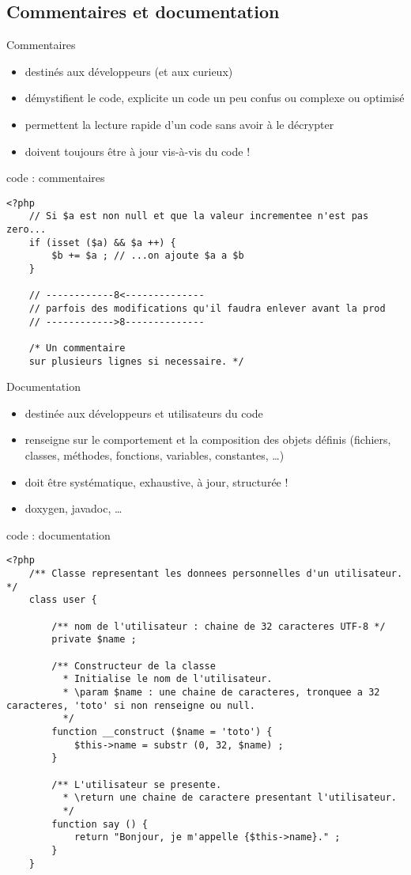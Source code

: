 \subsection{Commentaires et documentation}

\begin{frame}[containsverbatim]{Commentaires}
	\begin{itemize}
		\item destinés aux développeurs (et aux curieux)
		\item démystifient le code, explicite un code un peu confus ou complexe ou optimisé
		\item permettent la lecture rapide d'un code sans avoir à le décrypter
		\item doivent toujours être à jour vis-à-vis du code ! 
	\end{itemize}
	\begin{block}{code : commentaires}
		\begin{lstlisting}
<?php
	// Si $a est non null et que la valeur incrementee n'est pas zero...
	if (isset ($a) && $a ++) {
		$b += $a ; // ...on ajoute $a a $b
	}
	
	// ------------8<--------------
	// parfois des modifications qu'il faudra enlever avant la prod
	// ------------>8--------------	
	
	/* Un commentaire
	sur plusieurs lignes si necessaire. */
		\end{lstlisting}
	\end{block}
\end{frame}

\begin{frame}[containsverbatim]{Documentation}
	\begin{itemize}
		\item destinée aux développeurs et utilisateurs du code
		\item renseigne sur le comportement et la composition des objets définis (fichiers, classes, méthodes, fonctions, variables, constantes, \ldots)
		\item doit être systématique, exhaustive, à jour, structurée !
		\item doxygen, javadoc, \ldots
	\end{itemize}
	\begin{block}{code : documentation}
		\begin{lstlisting}
<?php
	/** Classe representant les donnees personnelles d'un utilisateur. */
	class user {
	
		/** nom de l'utilisateur : chaine de 32 caracteres UTF-8 */
		private $name ;
		
		/** Constructeur de la classe
		  * Initialise le nom de l'utilisateur.
		  * \param $name : une chaine de caracteres, tronquee a 32 caracteres, 'toto' si non renseigne ou null.
		  */
		function __construct ($name = 'toto') {
			$this->name = substr (0, 32, $name) ;
		}
		
		/** L'utilisateur se presente.
		  * \return une chaine de caractere presentant l'utilisateur.
		  */
		function say () {
			return "Bonjour, je m'appelle {$this->name}." ;
		}
	}
		\end{lstlisting}
	\end{block}
\end{frame}


